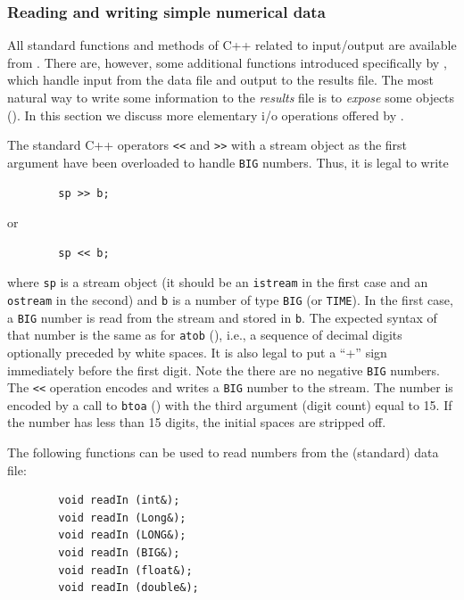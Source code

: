 \subsubsection{Reading and writing simple numerical data}
\label{rm_au_io_nd}

All standard functions and methods of C++ related to input/output are
available from \smurph.
There are, however, some additional functions introduced specifically 
by \smurph, which handle input from the data file and output to the
results file.
The most natural way to write some information to the {\em results\/} file
is to {\em expose\/} some objects ().
In this section we discuss more elementary i/o
operations offered by \smurph.

The standard C++ operators {\tt <<} and {\tt >>} with a stream object as the
first argument have been overloaded to handle {\tt BIG} numbers.
Thus, it is legal to write
\begin{verbatim}
        sp >> b;
\end{verbatim}
or
\begin{verbatim}
        sp << b;
\end{verbatim}
where {\tt sp} is a stream object (it should be an {\tt istream} in the
first case and an {\tt ostream} in the second) and {\tt b} is a number of type
{\tt BIG} (or {\tt TIME}).
In the first case, a {\tt BIG} number is read from the stream and stored in
{\tt b}.
The expected syntax of that number is the same as for {\tt atob}
(), i.e., a sequence of decimal digits optionally
preceded by white spaces.
It is also legal to put a ``+'' sign  immediately before the first digit.
Note the there are no negative {\tt BIG} numbers.
The {\tt <<} operation encodes and writes a {\tt BIG} number to the stream.
The number is encoded by a call to {\tt btoa} () with the third
argument (digit count) equal to 15.
If the number has less than 15 digits, the initial spaces are stripped off.

The following functions can be used to read numbers from the (standard)
data file:
\begin{verbatim}
        void readIn (int&);
        void readIn (Long&);
        void readIn (LONG&);
        void readIn (BIG&);
        void readIn (float&);
        void readIn (double&);
\end{verbatim}

